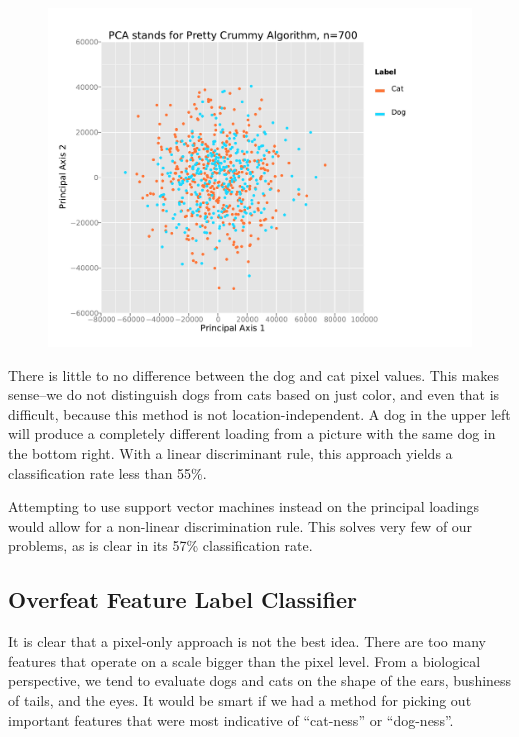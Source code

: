 \documentclass[12pt]{article}
\begin{document}
\begin{figure}[H] \center
\includegraphics[scale=.50]{PCA_plot.pdf} 
\end{figure}

There is little to no difference between the dog and cat pixel values. This makes sense--we do not distinguish dogs from cats based on just color, and even that is difficult, because this method is not location-independent. A dog in the upper left will produce a completely different loading from a picture with the same dog in the bottom right. With a linear discriminant rule, this approach yields a classification rate less than 55\%. 

Attempting to use support vector machines instead on the principal loadings would allow for a non-linear discrimination rule. This solves very few of our problems, as is clear in its 57\% classification rate.

\subsection{Overfeat Feature Label Classifier}
It is clear that a pixel-only approach is not the best idea. There are too many features that operate on a scale bigger than the pixel level. From a biological perspective, we tend to evaluate dogs and cats on the shape of the ears, bushiness of tails, and the eyes. It would be smart if we had a method for picking out important features that were most indicative of ``cat-ness'' or ``dog-ness''. 
\end{document}
